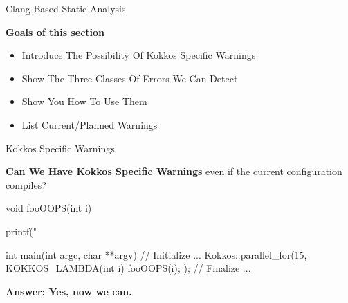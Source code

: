 
\begin{frame}[fragile]
  
  \vspace{-10pt}
  {\Huge Clang Based Static Analysis}
  \vspace{20pt}

  \textbf{\ul{Goals of this section}}
  \begin{itemize}
    \item {Introduce The Possibility Of Kokkos Specific Warnings}
    \item {Show The Three Classes Of Errors We Can Detect}
    \item {Show You How To Use Them}
    \item {List Current/Planned Warnings}
  \end{itemize}
\end{frame}


\begin{frame}[fragile]{Kokkos Specific Warnings}
  
  \textbf{\ul{Can We Have Kokkos Specific Warnings}}
  even if the current configuration compiles?
  \begin{code}[linebackgroundcolor={\btLstHL{6}{darkred!20}},
      keywords={}, frame=single
    ]
void fooOOPS(int i) { printf("%

int main(int argc, char **argv) {
  // Initialize  ...
  Kokkos::parallel_for(15, KOKKOS_LAMBDA(int i) {
       fooOOPS(i);
      });
  }
  // Finalize ...
}
  \end{code}

\pause
\textbf{Answer: Yes, now we can.}
\end{frame}


